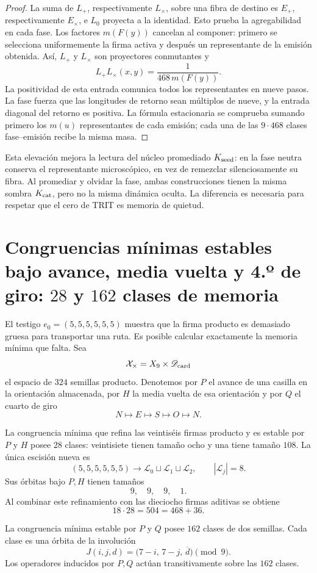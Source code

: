 \begin{proof}
La suma de \(L_+\), respectivamente \(L_\times\), sobre una fibra de destino
es \(E_+\), respectivamente \(E_\times\), e \(L_0\) proyecta a la identidad.
Esto prueba la agregabilidad en cada fase. Los factores \(m(F(y))\) cancelan
al componer: primero se selecciona uniformemente la firma activa y después un
representante de la emisión obtenida. Así, \(L_+\) y \(L_\times\) son
proyectores conmutantes y
\[
 L_+L_\times(x,y)=\frac1{468\,m(F(y))}.
\]
La positividad de esta entrada comunica todos los representantes en nueve
pasos. La fase fuerza que las longitudes de retorno sean múltiplos de nueve,
y la entrada diagonal del retorno es positiva. La fórmula estacionaria se
comprueba sumando primero los \(m(u)\) representantes de cada emisión; cada
una de las \(9\cdot468\) clases fase--emisión recibe la misma masa.
\end{proof}

Esta elevación mejora la lectura del núcleo promediado
\(K_{\rm seed}\): en la fase neutra conserva el representante microscópico,
en vez de remezclar silenciosamente su fibra. Al promediar y olvidar la fase,
ambas construcciones tienen la misma sombra \(K_{\rm cat}\), pero no la misma
dinámica oculta. La diferencia es necesaria para respetar que el cero de TRIT
es memoria de quietud.

\section{Congruencias mínimas estables bajo avance, media vuelta y 4.º de giro: \(28\) y \(162\) clases de memoria}

El testigo \(e_0=(5,5,5,5,5,5)\) muestra que la firma producto es demasiado
gruesa para transportar una ruta. Es posible calcular exactamente la memoria
mínima que falta. Sea
\[
 \mathcal X_\times=X_9\times\mathscr D_{\rm card}
\]
el espacio de \(324\) semillas producto. Denotemos por \(P\) el avance de una
casilla en la orientación almacenada, por \(H\) la media vuelta de esa
orientación y por \(Q\) el cuarto de giro
\[
 N\longmapsto E\longmapsto S\longmapsto O\longmapsto N.
\]

\begin{theorem}
\label{thm:congruencias-avance-giro}
La congruencia mínima que refina las veintiséis firmas producto y es estable
por \(P\) y \(H\) posee \(28\) clases: veintisiete tienen tamaño ocho y una
tiene tamaño \(108\). La única escisión nueva es
\[
 (5,5,5,5,5,5)\longrightarrow
 \mathcal L_0\sqcup\mathcal L_1\sqcup\mathcal L_2,
 \qquad |\mathcal L_j|=8.
\]
Sus órbitas bajo \(P,H\) tienen tamaños
\[
 9,\quad9,\quad9,\quad1.
\]
Al combinar este refinamiento con las dieciocho firmas aditivas se obtiene
\[
 18\cdot28=504=468+36.
\]

La congruencia mínima estable por \(P\) y \(Q\) posee \(162\) clases de dos
semillas. Cada clase es una órbita de la involución
\[
 J(i,j,d)=\bigl(7-i,\,7-j,\,\overline d\bigr)\pmod9.
\]
Los operadores inducidos por \(P,Q\) actúan transitivamente sobre las
\(162\) clases.
\end{theorem}

